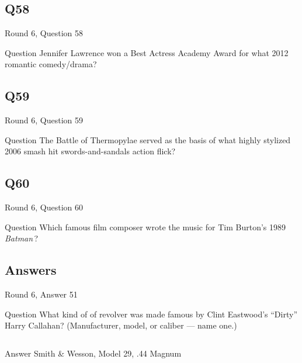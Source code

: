 \documentclass[11pt]{beamer}
\begin{document}
\subsection*{Q58}
\begin{frame}[t]{Round 6, Question 58}
  \vspace{2em}
  \begin{block}{Question}
    Jennifer Lawrence won a Best Actress Academy Award for what 2012 romantic comedy/drama?
  \end{block}
\end{frame}


\subsection*{Q59}
\begin{frame}[t]{Round 6, Question 59}
  \vspace{2em}
  \begin{block}{Question}
    The Battle of Thermopylae served as the basis of what highly stylized 2006 smash hit swords-and-sandals action flick?
  \end{block}
\end{frame}


\subsection*{Q60}
\begin{frame}[t]{Round 6, Question 60}
  \vspace{2em}
  \begin{block}{Question}
    Which famous film composer wrote the music for Tim Burton's 1989 \emph{Batman}\,?
  \end{block}
\end{frame}

\subsection{Answers}

\begin{frame}[t]{Round 6, Answer 51}
  \vspace{2em}
  \begin{block}{Question}
    What kind of of revolver was made famous by Clint Eastwood's ``Dirty'' Harry Callahan? (Manufacturer, model, or caliber — name one.)
  \end{block}
  \pause{}
  \begin{columns}[T,totalwidth=\linewidth]
    \begin{column}{0.35\linewidth}
      \begin{block}{Answer}
        Smith \& Wesson, Model 29, .44 Magnum
      \end{block}
    \end{column}
    \begin{column}{0.6\linewidth}
      \begin{center}
        \texttt{[image: \{Images/dirtyharry]}.jpg}
      \end{center}
    \end{column}
  \end{columns}
\end{frame}
\end{document}
